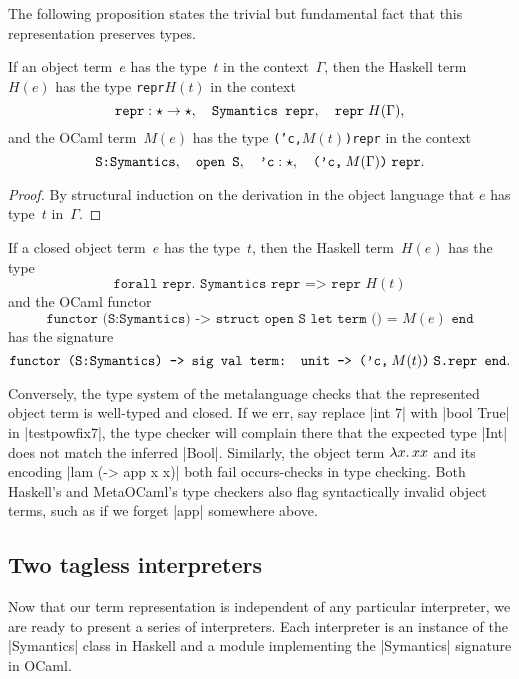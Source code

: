 The following proposition states the trivial but fundamental fact that
this representation preserves types.
\begin{proposition}\label{prop:typing}
If an object term~$e$ has the type~$t$ in the context~$\Gamma$,
then the Haskell term~$H(e)$ has the type \texttt{repr\;$H(t)$}
in the context
\[
    \texttt{repr}:\star\to\star,\quad
    \texttt{Symantics repr},\quad
    \texttt{repr}\;H(\Gamma)
    \text,
\]
and the OCaml term~$M(e)$ has the type \texttt{('c,\:$M(t)$)\;repr}
in the context
\[
    \texttt{S:Symantics},\quad
    \texttt{open S},\quad
    \texttt{'c}:\star,\quad
    \texttt{('c,\:$M(\Gamma)$)\;repr}
    \text.
\]
\end{proposition}
\begin{proof}
By structural induction on the derivation in the object language
that $e$ has type~$t$ in~$\Gamma$.
\end{proof}
\begin{corollary}\label{cor:typing}
If a closed object term~$e$ has the type~$t$,
then the Haskell term~$H(e)$ has the type
\[
    \texttt{forall repr. Symantics repr => repr $H(t)$}
\]
and the OCaml functor
\[
    \texttt{functor (S:Symantics) -> struct open S let term () = $M(e)$ end}
\]
has the signature
\[
    \texttt{functor (S:Symantics) -> sig val term: unit -> ('c,\:$M(t)$)\;S.repr end}
    \text{.}
\]
\end{corollary}

Conversely, the type system of the metalanguage checks that the
represented object term is well-typed and closed.
If we err, say replace |int 7| with |bool True| in
|testpowfix7|, the type checker will complain there that the expected type
|Int| does not match the inferred |Bool|.  Similarly, the object term
$\mathopen{\lambda\mathord{x}.\,}xx$ and its
encoding |lam (\x -> app x x)| both fail occurs-checks in type checking.
Both Haskell's and MetaOCaml's type checkers also flag syntactically invalid
object terms, such as if we forget |app| somewhere above.

\subsection{Two tagless interpreters}
\label{S:interpreter-RL}

Now that our term representation is independent of any particular interpreter,
we are ready to present a series of interpreters.  Each interpreter is an
instance of the |Symantics| class in Haskell and a module implementing
the |Symantics| signature in OCaml.


